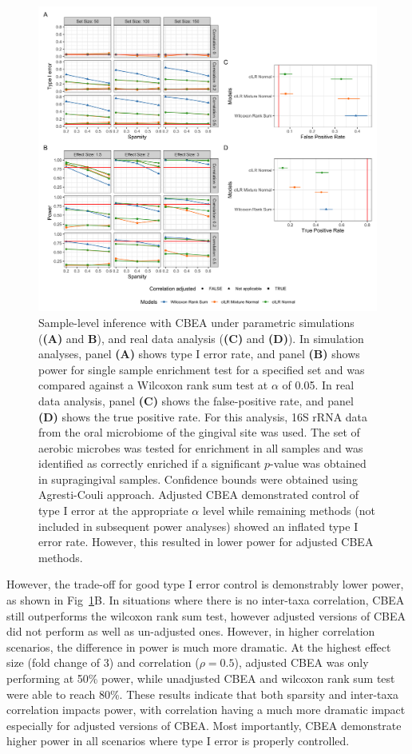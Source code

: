 \documentclass[10pt,letterpaper]{article}
\begin{document}
\begin{figure}[!h]
    \centering
    \includegraphics[width=\textwidth]{figures/sim_data_ss_hypo.png}
    \caption{Sample-level inference with CBEA under parametric simulations (\textbf{(A)} and \textbf{B}), and real data analysis (\textbf{(C)} and \textbf{(D)}). In simulation analyses, panel \textbf{(A)} shows type I error rate, and panel \textbf{(B)} shows power for single sample enrichment test for a specified set and was compared against a Wilcoxon rank sum test at $\alpha$ of 0.05. In real data analysis, panel \textbf{(C)} shows the false-positive rate, and panel \textbf{(D)} shows the true positive rate. For this analysis, 16S rRNA data from the oral microbiome of the gingival site was used. The set of aerobic microbes was tested for enrichment in all samples and was identified as correctly enriched if a significant $p$-value was obtained in supragingival samples. Confidence bounds were obtained using Agresti-Couli \cite{agresti1998} approach. Adjusted CBEA demonstrated control of type I error at the appropriate $\alpha$ level while remaining methods (not included in subsequent power analyses) showed an inflated type I error rate. However, this resulted in lower power for adjusted CBEA methods.}
    \label{fig:2}
\end{figure}

However, the trade-off for good type I error control is demonstrably lower power, as shown in Fig~\ref{fig:2}B. In situations where there is no inter-taxa correlation, CBEA still outperforms the wilcoxon rank sum test, however adjusted versions of CBEA did not perform as well as un-adjusted ones. However, in higher correlation scenarios, the difference in power is much more dramatic. At the highest effect size (fold change of 3) and correlation ($\rho = 0.5$), adjusted CBEA was only performing at 50\% power, while unadjusted CBEA and wilcoxon rank sum test were able to reach 80\%. These results indicate that both sparsity and inter-taxa correlation impacts power, with correlation having a much more dramatic impact especially for adjusted versions of CBEA. Most importantly, CBEA demonstrate higher power in all scenarios where type I error is properly controlled.    
\end{document}
